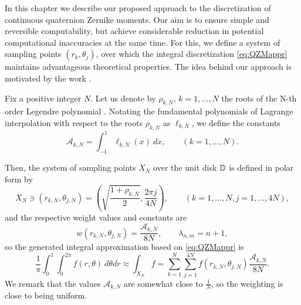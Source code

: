 In this chapter we describe our proposed approach to the discretization of continuous quaternion Zernike moments. Our aim is to ensure simple and reversible computability, but achieve considerable reduction in potential computational inaccuracies at the same time. For this, we define a system of sampling points $(r_k,\theta_j)$, over which the integral discretization \eqref{eq:QZMappr} maintains advantageous theoretical properties. The idea behind our approach is motivated by the work \cite{schipp}.

Fix a positive integer $N$. Let us denote by $\rho_{k,N}$, $k=1,\ldots,N$ the roots of the N-th order Legendre polynomial \cite{Szego}. Notating the fundamental polynomials of Lagrange interpolation with respect to the roots $\rho_{k,N}$ as $\ell_{k,N}$, we define the constants
\[
	\mathcal{A}_{k,N} = \int_{-1}^{1} \ell_{k,N}(x)\ dx, \qquad (k=1,\ldots,N).
\]

Then, the system of sampling points $X_N$ over the unit disk $\mathbb{D}$ is defined in polar form by
\[
	X_N\ni (r_{k,N}, \theta_{j,N}) = \left(\sqrt{\frac{1+\rho_{k,N}}{2}} , \frac{2\pi j}{4N} \right), \qquad (k=1,\ldots,N,j=1,\ldots,4N),
\]
and the respective weight values and constants are
\[
	w(r_{k,N},\theta_{j,N}) = \frac{\mathcal{A}_{k,N}}{8N},\qquad \lambda_{n,m} = n+1,
\]
so the generated integral approximation based on \eqref{eq:QZMappr} is
\[
	\frac{1}{\pi} \int_{0}^1 \int_0^{2\pi} f(r,\theta)\ d\theta dr \approx \int_{X_N} f = \sum_{k=1}^{N} \sum_{j=1}^{4N} f(r_{k,N},\theta_{j,N}) \frac{\mathcal{A}_{k,N}}{8N}.
\]
We remark that the values $\mathcal{A}_{k,N}$ are somewhat close to $\frac{1}{N}$, so the weighting is close to being uniform.

